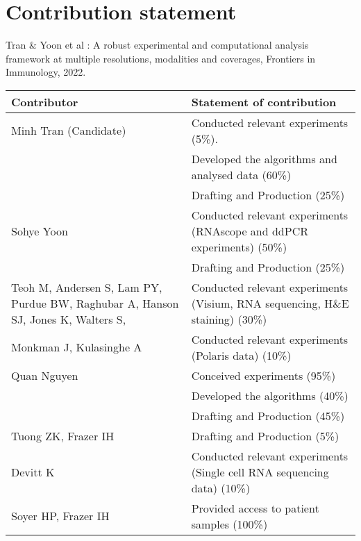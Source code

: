

\section*{Contribution statement}

\begin{instructional}
	Tran $\&$ Yoon et al \cite{tran2022robust}: A robust experimental and computational analysis framework at multiple resolutions, modalities and coverages, Frontiers in Immunology, 2022. 
\begin{table}[ht]	
\begin{tabularx}{\textwidth}{|X|X|} 
 \hline
 Contributor & Statement of contribution \\ 
 \hline\hline
 Minh Tran (Candidate) & Conducted relevant experiments (5\%). \\ 
 & Developed the algorithms and analysed data (60\%)  \\ 
 & Drafting and Production (25\%) \\
 \hline
 Sohye Yoon & Conducted relevant experiments (RNAscope and ddPCR experiments) (50\%)   \\
 & Drafting and Production (25\%) \\
 \hline
 Teoh M, Andersen S, Lam PY, Purdue BW, Raghubar A, Hanson SJ, Jones K, Walters S,  & Conducted relevant experiments (Visium, RNA sequencing, H$\&$E staining) (30\%) \\
 \hline
 Monkman J, Kulasinghe A & Conducted relevant experiments (Polaris data) (10\%) \\
 \hline
 Quan Nguyen & Conceived experiments (95\%) \\
  & Developed the algorithms (40\%) \\
  & Drafting and Production (45\%) \\
 \hline
 Tuong ZK, Frazer IH & Drafting and Production (5\%) \\
 \hline
 Devitt K & Conducted relevant experiments (Single cell RNA sequencing data) (10\%) \\
 \hline
 Soyer HP, Frazer IH & Provided access to patient samples (100\%)  \\ [1ex] 
 \hline
\end{tabularx}
\end{table} 
\end{instructional}

